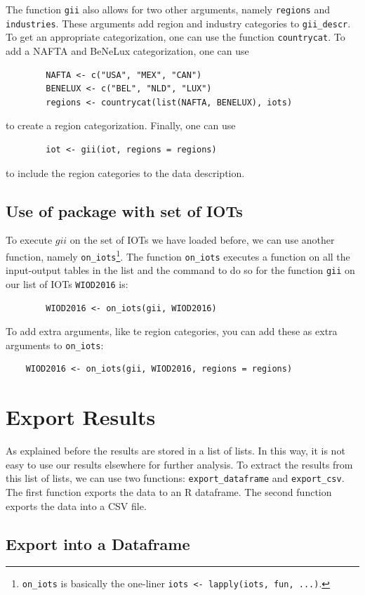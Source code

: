 \documentclass[10pt,a4paper]{paper}
\begin{document}
	The function \texttt{gii} also allows for two other arguments, namely \texttt{regions} and \texttt{industries}. These arguments add region and industry categories to \texttt{gii\_descr}. To get an appropriate categorization, one can use the function \texttt{countrycat}. To add a NAFTA and BeNeLux categorization, one can use
	\begin{verbatim}
		NAFTA <- c("USA", "MEX", "CAN")
		BENELUX <- c("BEL", "NLD", "LUX") 
		regions <- countrycat(list(NAFTA, BENELUX), iots)
	\end{verbatim} 
	to create a region categorization. Finally, one can use
	\begin{verbatim}
		iot <- gii(iot, regions = regions)
	\end{verbatim}
	to include the region categories to the data description.
	
	\subsection{Use of package with set of IOTs}
	To execute $gii$ on the set of IOTs we have loaded before, we can use another function, namely \texttt{on\_iots}\footnote{\texttt{on\_iots} is basically the one-liner \texttt{iots <- lapply(iots, fun, ...)}.}. The function \texttt{on\_iots} executes a function on all the input-output tables in the list and the command to do so for the function \texttt{gii} on our list of IOTs \texttt{WIOD2016} is:
	\begin{verbatim}
		WIOD2016 <- on_iots(gii, WIOD2016)
	\end{verbatim}
	To add extra arguments, like te region categories, you can add these as extra arguments to \texttt{on\_iots}:
	\begin{verbatim}
	WIOD2016 <- on_iots(gii, WIOD2016, regions = regions)
	\end{verbatim}
	
	\section{Export Results}
	As explained before the results are stored in a list of lists. In this way, it is not easy to use our results elsewhere for further analysis. To extract the results from this list of lists, we can use two functions: \texttt{export\_dataframe} and \texttt{export\_csv}. The first function exports the data to an R dataframe. The second function exports the data into a CSV file.
	\subsection{Export into a Dataframe}
	
\end{document}
